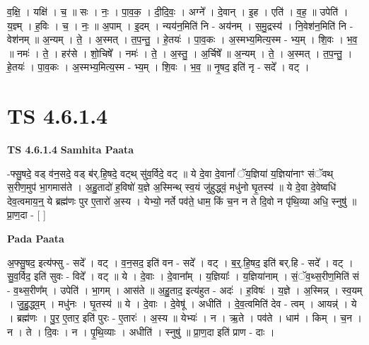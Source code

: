 \documentclass[17pt]{extarticle}
\begin{document}
व॒क्षि॒ । यक्षि॑ । च॒ ॥ सः । नः॒ । पा॒व॒क॒ । दी॒दि॒वः॒ । अग्ने᳚ । दे॒वान् । इ॒ह । एति॑ । व॒ह॒ ॥ उपेति॑ । य॒ज्ञ्म् । ह॒विः । च॒ । नः॒ ॥ अ॒पाम् । इ॒दम् । न्यय॑न॒मिति॑ नि - अय॑नम् । स॒मु॒द्रस्य॑ । नि॒वेश॑न॒मिति॑ नि - वेश॑नम् ॥ अ॒न्यम् । ते॒ । अ॒स्मत् । त॒प॒न्तु॒ । हे॒तयः॑ । पा॒व॒कः । अ॒स्मभ्य॒मित्य॒स्म - भ्य॒म् । शि॒वः । भ॒व॒ ॥ नमः॑ । ते॒ । हर॑से । शो॒चिषे᳚ । नमः॑ । ते॒ । अ॒स्तु॒ । अ॒र्चिषे᳚ ॥ अ॒न्यम् । ते॒ । अ॒स्मत् । त॒प॒न्तु॒ । हे॒तयः॑ । पा॒व॒कः । अ॒स्मभ्य॒मित्य॒स्म - भ्य॒म् । शि॒वः । भ॒व॒ ॥ नृ॒षद॒ इति॑ नृ - सदे᳚ । वट् ।  \newline





\section{ TS 4.6.1.4 }

\textbf{TS 4.6.1.4 } \newline
\textbf{Samhita Paata} \newline

-फ्सु॒षदे॒ वड् व॑न॒सदे॒ वड् ब॑र्.हि॒षदे॒ वट्थ् सु॑व॒र्विदे॒ वट् ॥ ये दे॒वा दे॒वानां᳚ ॅय॒ज्ञिया॑ य॒ज्ञिया॑नाꣳ संॅवथ् स॒रीण॒मुप॑ भा॒गमास॑ते । अ॒हु॒तादो॑ ह॒विषो॑ य॒ज्ञे अ॒स्मिन्थ् स्व॒यं जु॑हुद्ध्वं॒ मधु॑नो घृ॒तस्य॑ ॥ ये दे॒वा दे॒वेष्वधि॑ देव॒त्वमाय॒न्॒ ये ब्रह्म॑णः पुर ए॒तारो॑ अ॒स्य । येभ्यो॒ नर्ते पव॑ते॒ धाम॒ किं च॒न न ते दि॒वो न पृ॑थि॒व्या अधि॒ स्नुषु॑ ॥ प्रा॒ण॒दा - [  ] \newline

\textbf{Pada Paata} \newline

अ॒फ्सु॒षद॒ इत्य॑फ्सु - सदे᳚ । वट् । व॒न॒सद॒ इति॑ वन - सदे᳚ । वट् । ब॒र्॒.हि॒षद॒ इति॑ बर्.हि - सदे᳚ । वट् । सु॒व॒र्विद॒ इति॑ सुवः - विदे᳚ । वट् ॥ ये । दे॒वाः । दे॒वाना᳚म् । य॒ज्ञियाः᳚ । य॒ज्ञिया॑नाम् । सं॒ॅव॒थ्स॒रीण॒मिति॑ सं - व॒थ्स॒रीण᳚म् । उपेति॑ । भा॒गम् । आस॑ते ॥ अ॒हु॒ताद॒ इत्य॑हुत - अदः॑ । ह॒विषः॑ । य॒ज्ञे । अ॒स्मिन्न् । स्व॒यम् । जु॒हु॒द्ध्व॒म् । मधु॑नः । घृ॒तस्य॑ ॥ ये । दे॒वाः । दे॒वेषू॑ । अधीति॑ । दे॒व॒त्वमिति॑ देव - त्वम् । आयन्न्॑ । ये । ब्रह्म॑णः । पु॒र॒ ए॒तार॒ इति॑ पुरः - ए॒तारः॑ । अ॒स्य ॥ येभ्यः॑ । न । ऋ॒ते । पव॑ते । धाम॑ । किम् । च॒न । न । ते । दि॒वः । न । पृ॒थि॒व्याः । अधीति॑ । स्नुषु॑ ॥ प्रा॒ण॒दा इति॑ प्राण - दाः ।  \newline




\end{document}
